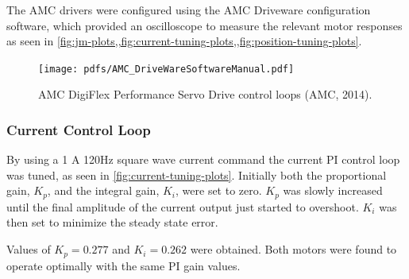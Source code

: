 The AMC drivers were configured using the AMC Driveware configuration software, which provided an oscilloscope to measure the relevant motor responses as seen in \cref{fig:jm-plots,,fig:current-tuning-plots,,fig:position-tuning-plots}.

\begin{figure}
\centering
\texttt{[image: pdfs/AMC\_DriveWareSoftwareManual.pdf]} 
\caption{AMC DigiFlex Performance Servo Drive control loops (AMC, 2014).}
\label{fig:AMCControlLoops}
\end{figure}

\subsubsection{Current Control Loop}

By using a 1 A 120Hz square wave current command the current PI control loop was tuned, as seen in \cref{fig:current-tuning-plots}. Initially both  the proportional gain, $K_p$, and the integral gain, $K_i$, were set to zero. $K_p$ was slowly increased until the final amplitude of the current output just started to overshoot. $K_i$ was then set to minimize the steady state error. 

Values of $K_p = 0.277$ and $K_i = 0.262$ were obtained. Both motors were found to operate optimally with the same PI gain values.

